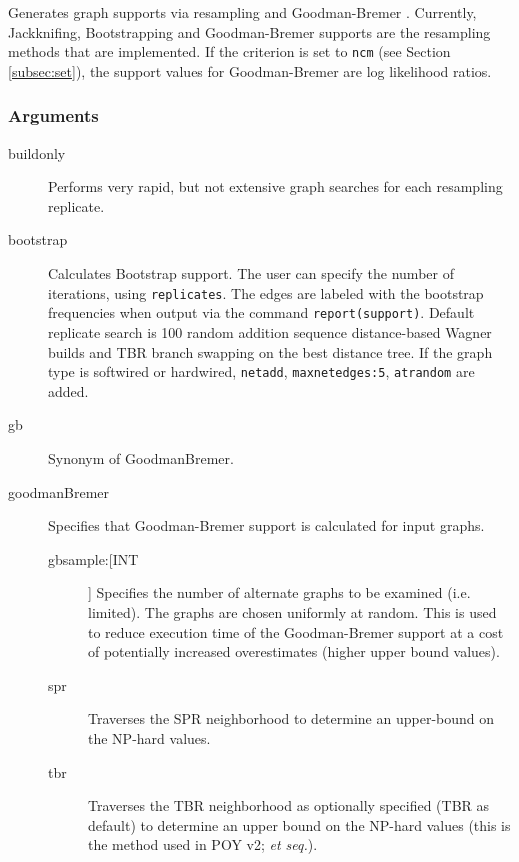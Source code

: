	\begin{phygdescription}
		{Generates graph supports via resampling \citep{Farrisetal1996} and Goodman-Bremer 
		\citep{Goodmanetal1982, bremer1994}. Currently, Jackknifing, Bootstrapping and 
		Goodman-Bremer supports are the resampling methods that are implemented. If
		the criterion is set to \texttt{ncm} (see Section \ref{subsec:set}), the support values 
		for Goodman-Bremer are log likelihood ratios.}
	\end{phygdescription}
		
	\subsubsection{Arguments}
		\begin{description}
		\item[buildonly] Performs very rapid, but not extensive graph searches for each 
		resampling replicate.
		
		\item[bootstrap] Calculates Bootstrap support. The user can specify the number of 
		iterations, using \texttt{replicates}. The edges are labeled with the bootstrap 
		frequencies when output via the command \texttt{report(support)}. Default replicate search is 100 random addition 
		sequence distance-based Wagner builds and TBR branch swapping on the best distance tree.
		If the graph type is softwired or hardwired, \texttt{netadd}, \texttt{maxnetedges:5}, \texttt{atrandom} are 
		added. 
		
		\item[gb] Synonym of GoodmanBremer.
			
		\item[goodmanBremer] Specifies that Goodman-Bremer support is 
		calculated for input graphs. 
			
			\begin{description}
			\item[gbsample:[INT]] Specifies the number of alternate graphs to be examined (i.e. limited). 
			The graphs are chosen uniformly at random.  This is used to reduce execution time of the Goodman-Bremer
			support at a cost of potentially increased overestimates (higher upper bound values). 
			
			\item[spr] Traverses the SPR neighborhood to determine an upper-bound on 
			the NP-hard values.
			
			\item[tbr] Traverses the TBR neighborhood 
			as optionally specified (TBR as default) to determine an upper bound on the NP-hard 
			values (this is the method used in POY v2; \citealp{POY2} \textit{et seq.}).
			\end{description}
		

\end{description}
